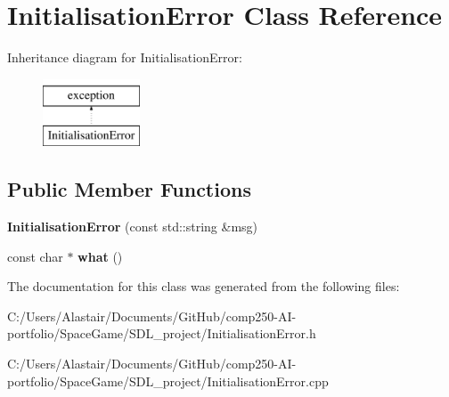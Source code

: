 \hypertarget{class_initialisation_error}{}\section{Initialisation\+Error Class Reference}
\label{class_initialisation_error}
Inheritance diagram for Initialisation\+Error\+:\begin{figure}[H]
\begin{center}
\leavevmode
\includegraphics[height=2.000000cm]{class_initialisation_error}
\end{center}
\end{figure}
\subsection*{Public Member Functions}
\begin{DoxyCompactItemize}
\item 
\mbox{\label{class_initialisation_error_ad3914b576cdb5ebffb1cee546167a769}} 
{\bfseries Initialisation\+Error} (const std\+::string \&msg)
\item 
\mbox{\label{class_initialisation_error_afb7ca00778bc562ed3e763410c64ecfc}} 
const char $\ast$ {\bfseries what} ()
\end{DoxyCompactItemize}


The documentation for this class was generated from the following files\+:\begin{DoxyCompactItemize}
\item 
C\+:/\+Users/\+Alastair/\+Documents/\+Git\+Hub/comp250-\/\+A\+I-\/portfolio/\+Space\+Game/\+S\+D\+L\+\_\+project/Initialisation\+Error.\+h\item 
C\+:/\+Users/\+Alastair/\+Documents/\+Git\+Hub/comp250-\/\+A\+I-\/portfolio/\+Space\+Game/\+S\+D\+L\+\_\+project/Initialisation\+Error.\+cpp\end{DoxyCompactItemize}
